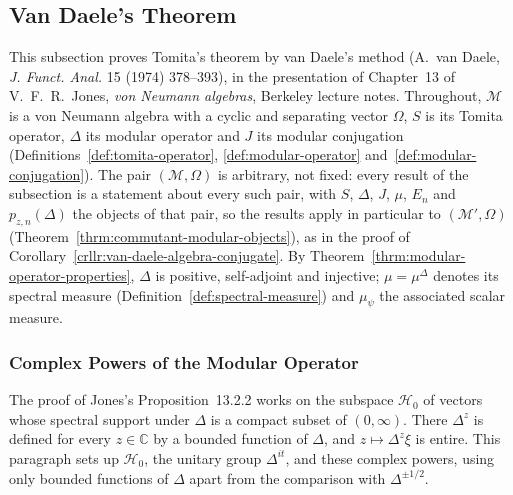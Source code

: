 \subsection{Van Daele's Theorem}\label{sbsctn:van-daele}

This subsection proves Tomita's theorem by van Daele's method (A.~van Daele, \emph{J. Funct. Anal.} 15 (1974) 378--393), in the presentation of Chapter~13 of V.~F.~R.~Jones, \emph{von Neumann algebras}, Berkeley lecture notes. Throughout, $\mathcal{M}$ is a von Neumann algebra with a cyclic and separating vector $\Omega$, $S$ is its Tomita operator, $\Delta$ its modular operator and $J$ its modular conjugation (Definitions~\ref{def:tomita-operator}, \ref{def:modular-operator} and~\ref{def:modular-conjugation}). The pair $(\mathcal{M}, \Omega)$ is arbitrary, not fixed: every result of the subsection is a statement about every such pair, with $S$, $\Delta$, $J$, $\mu$, $E_n$ and $p_{z,n}(\Delta)$ the objects of that pair, so the results apply in particular to $(\mathcal{M}', \Omega)$ (Theorem~\ref{thrm:commutant-modular-objects}), as in the proof of Corollary~\ref{crllr:van-daele-algebra-conjugate}. By Theorem~\ref{thrm:modular-operator-properties}, $\Delta$ is positive, self-adjoint and injective; $\mu = \mu^\Delta$ denotes its spectral measure (Definition~\ref{def:spectral-measure}) and $\mu_\psi$ the associated scalar measure.

\subsubsection{Complex Powers of the Modular Operator}

The proof of Jones's Proposition~13.2.2 works on the subspace $\mathcal{H}_0$ of vectors whose spectral support under $\Delta$ is a compact subset of $(0, \infty)$. There $\Delta^z$ is defined for every $z \in \mathbb{C}$ by a bounded function of $\Delta$, and $z \mapsto \Delta^z\xi$ is entire. This paragraph sets up $\mathcal{H}_0$, the unitary group $\Delta^{it}$, and these complex powers, using only bounded functions of $\Delta$ apart from the comparison with $\Delta^{\pm 1/2}$.

